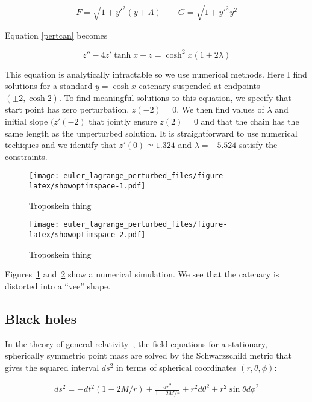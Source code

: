 \documentclass[pdflatex,sn-mathphys-num]{sn-jnl}%
\theoremstyle{thmstyleone}%
\theoremstyle{thmstyletwo}%
\theoremstyle{thmstylethree}%
\begin{document}
\begin{equation}
  F = \sqrt{1+y'^2}(y+\Lambda)\qquad
  G = \sqrt{1+y'^2}y^2
\end{equation}

Equation \ref{pertcan} becomes

\begin{equation}
  z'' - 4z'\tanh x - z = \cosh^2 x(1+2\lambda)
\end{equation}

This equation is analytically intractable so we use numerical methods.
Here I find solutions for a standard $y=\cosh x$ catenary suspended at
endpoints $(\pm 2, \cosh 2)$.  To find meaningful solutions to this
equation, we specify that start point has zero perturbation,
$z(-2)=0$.  We then find values of $\lambda$ and initial slope
$(z'(-2)$ that jointly ensure $z(2)=0$ and that the chain has the same
length as the unperturbed solution.  It is straightforward to use
numerical techiques and we identify that $z'(0)\simeq 1.324$ and
$\lambda = -5.524$ satisfy the constraints.


\begin{figure}[h]
\centering
\texttt{[image: euler\_lagrange\_perturbed\_files/figure-latex/showoptimspace-1.pdf]}
\caption{Troposkein thing}\label{space}
\end{figure}

\begin{figure}[h]
\centering
\texttt{[image: euler\_lagrange\_perturbed\_files/figure-latex/showoptimspace-2.pdf]}
\caption{Troposkein thing}\label{space2}
\end{figure}

Figures~\ref{space} and~\ref{space2} show a numerical simulation.  We
see that the catenary is distorted into a ``vee'' shape.


\subsection{Black holes}

In the theory of general relativity~\cite{misner}, the field equations
for a stationary, spherically symmetric point mass are solved by the
Schwarzschild metric that gives the squared interval $ds^2$ in terms
of spherical coordinates $(r,\theta,\phi)$:

\begin{eqnarray}\label{schwarzschild}
  ds^2=
  -dt^2(1-2M/r) + \frac{dr^2}{1-2M/r} + r^2d\theta^2 + r^2\sin\theta d\phi^2
  \end{eqnarray}
\end{document}
